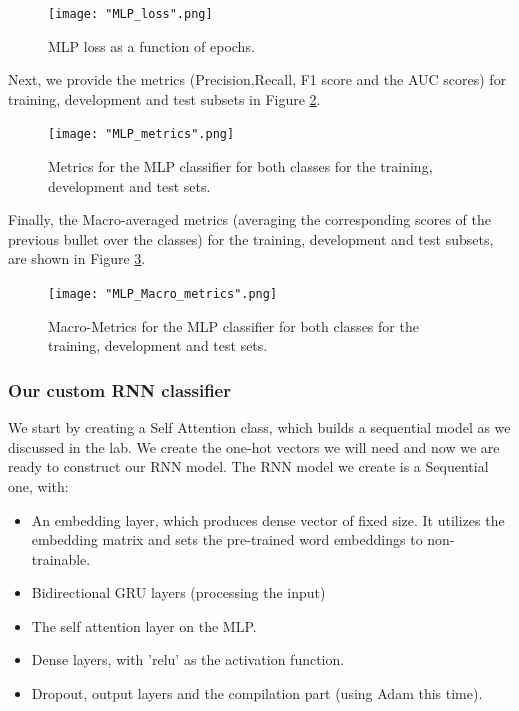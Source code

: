 \documentclass[10pt, a4paper]{article}
\begin{document}
	\begin{figure}
		\centering
		\texttt{[image: "MLP\_loss".png]}
		\caption{MLP loss as a function of epochs.}
		\label{fig::mlp_loss}
	\end{figure}
	
	Next, we provide the metrics (Precision,Recall, F1 score and the AUC scores) for training, development and test subsets in Figure \ref{fig::mlp_metrics}.
	
	\begin{figure}
		\centering
		\texttt{[image: "MLP\_metrics".png]}
		\caption{Metrics for the MLP classifier for both classes for the training, development and test sets.}
		\label{fig::mlp_metrics}
	\end{figure}
	
	Finally,  the Macro-averaged metrics (averaging the corresponding scores of the previous bullet over the classes) for the training, development and test subsets, are shown in Figure \ref{fig::mlp_macro_metrics}.
	
	\begin{figure}
		\centering
		\texttt{[image: "MLP\_Macro\_metrics".png]}
		\caption{Macro-Metrics for the MLP classifier for both classes for the training, development and test sets.}
		\label{fig::mlp_macro_metrics}
	\end{figure}
	
	\subsubsection{Our custom RNN classifier}
	We start by creating a Self Attention class, which builds a sequential model as we discussed in the lab. We create the one-hot vectors we will need and now we are ready to construct our RNN model. The RNN model we create is a Sequential one, with:
    \begin{itemize}
        \item An embedding layer, which produces dense vector of fixed size. It utilizes the embedding matrix and sets the pre-trained word embeddings to non-trainable.
        \item Bidirectional GRU layers (processing the input)
        \item The self attention layer on the MLP.
        \item Dense layers, with 'relu' as the activation function.
        \item Dropout, output layers and the compilation part (using Adam this time).
    \end{itemize}
\end{document}

